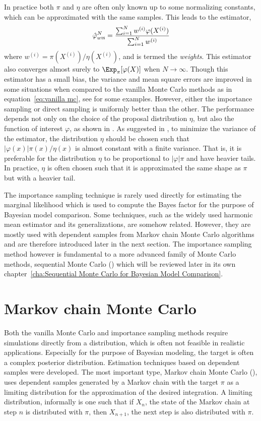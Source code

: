 In practice both $\pi$ and $\eta$ are often only known up to some normalizing
constants, which can be approximated with the same samples. This leads to the
estimator,
\begin{equation}
  \hat\varphi_{w\text{\textsc{is}}}^N
  = \frac{\sum_{i=1}^Nw^{(i)}\varphi(X^{(i)})}{\sum_{i=1}^Nw^{(i)}}
\end{equation}
where $w^{(i)} = \pi(X^{(i)})/\eta(X^{(i)})$, and is termed the
\emph{weights}. This estimator also converges almost surely to
$\Exp_{\pi}[\varphi(X)]$ when $N\to\infty$. Though this estimator has a small
bias, the variance and mean square errors are improved in some situations when
compared to the vanilla Monte Carlo methods as in equation~\eqref{eq:vanilla
  mc}, see \cite{Casella:1998tj} for some examples. However, either the
importance sampling or direct sampling is uniformly better than the other. The
performance depends not only on the choice of the proposal distribution
$\eta$, but also the function of interest $\varphi$, as shown in
\cite{Casella:1998tj}. As suggested in \cite[][sec.~3.3.2]{Robert:2004tn}, to
minimize the variance of the estimator, the distribution $\eta$ should be
chosen such that $|\varphi(x)|\pi(x)/\eta(x)$ is almost constant with a finite
variance. That is, it is preferable for the distribution $\eta$ to be
proportional to $|\varphi|\pi$ and have heavier tails. In practice, $\eta$ is
often chosen such that it is approximated the same shape as $\pi$ but with a
heavier tail.

The importance sampling technique is rarely used directly for estimating the
marginal likelihood which is used to compute the Bayes factor for the purpose
of Bayesian model comparison. Some techniques, such as the widely used
harmonic mean estimator and its generalizations, are somehow related. However,
they are mostly used with dependent samples from Markov chain Monte Carlo
algorithms and are therefore introduced later in the next section. The
importance sampling method however is fundamental to a more advanced family of
Monte Carlo methods, sequential Monte Carlo (\smc) which will be reviewed
later in its own chapter~\ref{cha:Sequential Monte Carlo for Bayesian Model
  Comparison}.

\section{Markov chain Monte Carlo}
\label{sec:Markov chain Monte Carlo}

Both the vanilla Monte Carlo and importance sampling methods require
simulations directly from a distribution, which is often not feasible in
realistic applications. Especially for the purpose of Bayesian modeling, the
target is often a complex posterior distribution. Estimation techniques based
on dependent samples were developed. The most important type, Markov chain
Monte Carlo (\mcmc), uses dependent samples generated by a Markov chain with
the target $\pi$ as a limiting distribution for the approximation of the
desired integration. A limiting distribution, informally is one such that if
$X_n$, the state of the Markov chain at step $n$ is distributed with $\pi$,
then $X_{n+1}$, the next step is also distributed with $\pi$.

